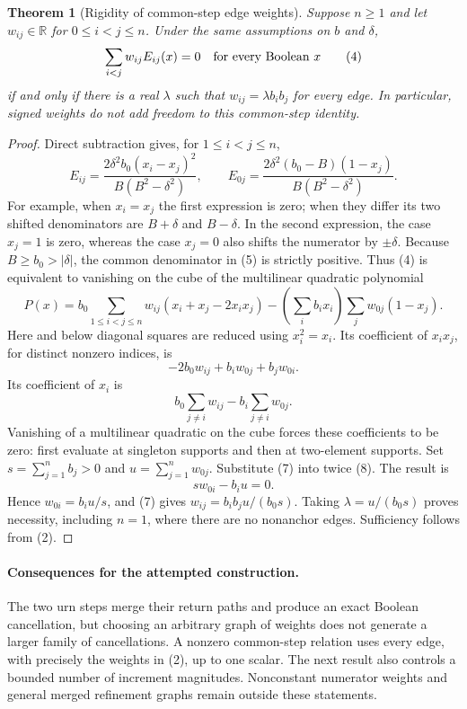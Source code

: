 \documentclass[11pt]{article}
\newtheorem{theorem}{Theorem}
\begin{document}
\begin{theorem}[Rigidity of common-step edge weights]
Suppose $n\ge1$ and let $w_{ij}\in\mathbb R$ for
$0\le i<j\le n$. Under the same assumptions on $b$ and $\delta$,
\[
 \sum_{i<j} w_{ij}E_{ij}(x)=0\quad\hbox{for every Boolean }x
 \tag{4}
\]
if and only if there is a real $\lambda$ such that
$w_{ij}=\lambda b_i b_j$ for every edge. In particular, signed
weights do not add freedom to this common-step identity.
\end{theorem}
\begin{proof}
Direct subtraction gives, for $1\le i<j\le n$,
\[
 E_{ij}=\frac{2\delta^2 b_0(x_i-x_j)^2}
                    {B(B^2-\delta^2)},\qquad
 E_{0j}=\frac{2\delta^2(b_0-B)(1-x_j)}
                    {B(B^2-\delta^2)}.
 \tag{5}
\]
For example, when $x_i=x_j$ the first expression is zero; when
they differ its two shifted denominators are $B+\delta$ and
$B-\delta$. In the second expression, the case $x_j=1$ is zero,
whereas the case $x_j=0$ also shifts the numerator by $\pm\delta$.
Because $B\ge b_0>|\delta|$, the common denominator in (5) is
strictly positive. Thus (4) is equivalent to vanishing on the cube
of the multilinear quadratic polynomial
\[
 P(x)=b_0\sum_{1\le i<j\le n}w_{ij}(x_i+x_j-2x_ix_j)
      -\left(\sum_i b_i x_i\right)\sum_j w_{0j}(1-x_j).
 \tag{6}
\]
Here and below diagonal squares are reduced using $x_i^2=x_i$.
Its coefficient of $x_ix_j$, for distinct nonzero indices, is
\[
                  -2b_0 w_{ij}+b_iw_{0j}+b_jw_{0i}.
 \tag{7}
\]
Its coefficient of $x_i$ is
\[
                  b_0\sum_{j\ne i}w_{ij}
                         -b_i\sum_{j\ne i}w_{0j}.
 \tag{8}
\]
Vanishing of a multilinear quadratic on the cube forces these
coefficients to be zero: first evaluate at singleton supports and
then at two-element supports. Set $s=\sum_{j=1}^n b_j>0$ and
$u=\sum_{j=1}^n w_{0j}$. Substitute (7) into twice (8). The
result is
\[
                         s w_{0i}-b_i u=0.
 \tag{9}
\]
Hence $w_{0i}=b_i u/s$, and (7) gives
$w_{ij}=b_i b_j u/(b_0s)$. Taking $\lambda=u/(b_0s)$ proves
necessity, including $n=1$, where there are no nonanchor edges.
Sufficiency follows from (2).
\end{proof}

\paragraph{Consequences for the attempted construction.}
The two urn steps merge their return paths and produce an exact
Boolean cancellation, but choosing an arbitrary graph of weights
does not generate a larger family of cancellations. A nonzero
common-step relation uses every edge, with precisely the weights
in (2), up to one scalar. The next result also controls a bounded
number of increment magnitudes. Nonconstant numerator weights and
general merged refinement graphs remain outside these statements.
\end{document}
